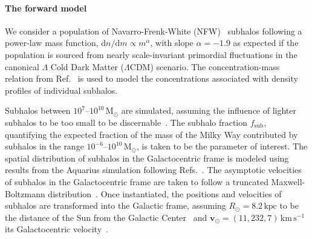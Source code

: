 \documentclass[]{article}
\begin{document}
\paragraph{The forward model}  We consider a population of Navarro-Frenk-White (NFW)~\citep{Navarro:1995iw} subhalos following a power-law mass function, $\mathrm dn / \mathrm dm \propto m^\alpha$, with slope $\alpha = -1.9$ as expected if the population is sourced from nearly scale-invariant primordial fluctuations in the canonical $\Lambda$ Cold Dark Matter ($\Lambda$CDM) scenario. The concentration-mass relation from Ref.~\cite{Sanchez-Conde:2013yxa} is used to model the concentrations associated with density profiles of individual subhalos. 

Subhalos between $10^7$--$10^{10}\,\mathrm{M}_\odot$ are simulated, assuming the influence of lighter subhalos to be too small to be discernable~\citep{Mishra-Sharma:2020ynk}. The subhalo fraction $f_\mathrm{sub}$, quantifying the expected fraction of the mass of the Milky Way contributed by subhalos in the range $10^{-6}$--$10^{10}\,\mathrm{M}_\odot$, is taken to be the parameter of interest. The spatial distribution of subhalos in the Galactocentric frame is modeled using results from the Aquarius simulation following Refs.~\cite{Hutten:2016jko,Springel:2008cc}. 
The asymptotic velocities of subhalos in the Galactocentric frame are taken to follow a truncated Maxwell-Boltzmann distribution~\citep{1939isss.book.....C,Lisanti:2016jxe}. 
Once instantiated, the positions and velocities of subhalos are transformed into the Galactic frame, assuming $R_\odot = 8.2\,\mathrm{kpc}$ to be the distance of the Sun from the Galactic Center~\citep{2019A&A...625L..10G,2020arXiv201202169B} and $\mathbf{v}_{\odot} = (11, 232, 7)\,\mathrm{km}\,\mathrm{s}^{-1}$ its Galactocentric velocity~\citep{2010MNRAS.403.1829S}. 
\end{document}
